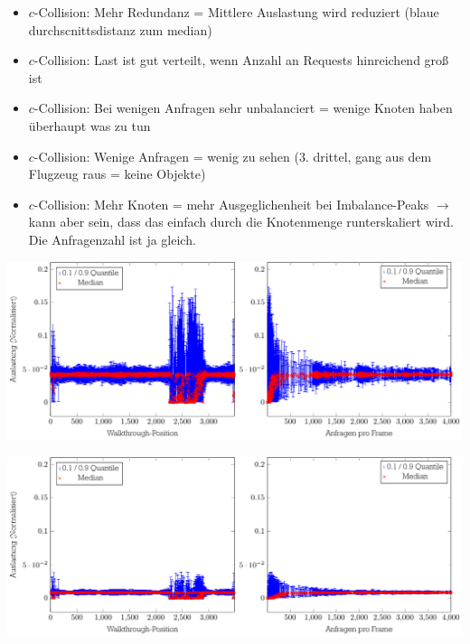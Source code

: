 \begin{itemize}
\item $c$-Collision: Mehr Redundanz = Mittlere Auslastung wird reduziert (blaue durchscnittsdistanz zum median)
\item $c$-Collision: Last ist gut verteilt, wenn Anzahl an Requests hinreichend groß ist
\item $c$-Collision: Bei wenigen Anfragen sehr unbalanciert = wenige Knoten haben überhaupt was zu tun
\item $c$-Collision: Wenige Anfragen = wenig zu sehen (3. drittel, gang aus dem Flugzeug raus = keine Objekte)
\item $c$-Collision: Mehr Knoten = mehr Ausgeglichenheit bei Imbalance-Peaks $\rightarrow$ kann aber sein, dass das einfach durch die Knotenmenge runterskaliert wird. Die Anfragenzahl ist ja gleich.
\end{itemize}

\begin{Bild}
\includegraphics[scale=0.75]{images/diag_cCol_red1_render4_data24_2x.pdf}
\end{Bild}

\begin{Bild}
\includegraphics[scale=0.75]{images/diag_cCol_red3_render4_data120_2x.pdf}
\end{Bild}
